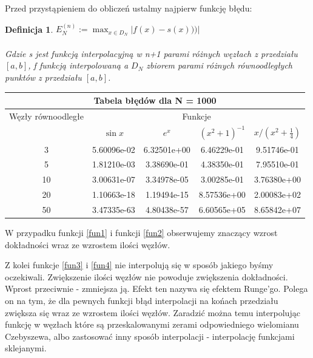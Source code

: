 \documentclass{article}
\newtheorem{defi}{Definicja}
\begin{document}
Przed przystąpieniem do obliczeń ustalmy najpierw funkcję błędu:
\begin{defi}\label{Error}
	$E_N^{(n)} := \max_{x \in D_N}|f(x)-s(x)))|$ \\
	\\
	Gdzie s jest funkcją interpolacyjną w n+1 parami różnych węzłach z przedziału $[a,b]$, f funkcją interpolowaną a $D_N$ zbiorem parami różnych równoodległych punktów z przedziału $[a,b]$.
\end{defi}

\renewcommand{\arraystretch}{1.5}  
\begin{center}
	\begin{tabular}{||c||c|c|c|c||} \hline
		\multicolumn{5}{||c||}{Tabela błędów dla N = 1000} \\ \hline
		Węzły równoodległe 	& \multicolumn{4}{|c||}{Funkcje} \\ \cline{2-5}
				& $\sin x$ & $e^x$ & $(x^{2}+1)^{-1}$ & $x/(x^{2} + \frac{1}{4})$ \\ \hline					
		3 		& 5.60096e-02 &  6.32501e+00 &  6.46229e-01 & 9.51746e-01 \\ \hline
		5 		& 1.81210e-03 &  3.38690e-01 &  4.38350e-01 & 7.95510e-01 \\ \hline
		10  	& 3.00631e-07 &  3.34978e-05 &  3.00285e-01 & 3.76380e+00 \\ \hline
		20  	& 1.10663e-18 &  1.19494e-15 &  8.57536e+00 & 2.00083e+02 \\ \hline
		50  	& 3.47335e-63 &  4.80438e-57 &  6.60565e+05 & 8.65842e+07 \\ \hline
	\end{tabular}
\end{center}
\renewcommand{\arraystretch}{1}

W przypadku funkcji \eqref{fun1} i funkcji \eqref{fun2} obserwujemy znaczący wzrost dokładności wraz ze wzrostem ilości węzłów. 

Z kolei funkcje \eqref{fun3} i \eqref{fun4} nie interpolują się w sposób jakiego byśmy oczekiwali. Zwiększenie ilości węzłów nie powoduje zwiększenia dokładności. Wprost przeciwnie - zmniejsza ją. Efekt ten nazywa się efektem Runge'go. Polega on na tym, że dla pewnych funkcji błąd interpolacji na końach przedziału zwiększa się wraz ze wzrostem ilości węzłów.
Zaradzić można temu interpolując funkcję w węzłach które są przeskalowanymi zerami odpowiedniego wielomianu Czebyszewa, albo zastosować inny sposób interpolacji - interpolację funkcjami sklejanymi.
\end{document}
